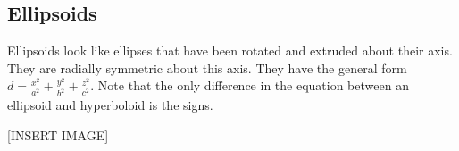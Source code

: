 \subsection{Ellipsoids}
\noindent
Ellipsoids look like ellipses that have been rotated and extruded about their axis. They are radially symmetric about this axis. They have the general form $d=\frac{x^2}{a^2}+\frac{y^2}{b^2}+\frac{z^2}{c^2}$. Note that the only difference in the equation between an ellipsoid and hyperboloid is the signs.

[INSERT IMAGE]